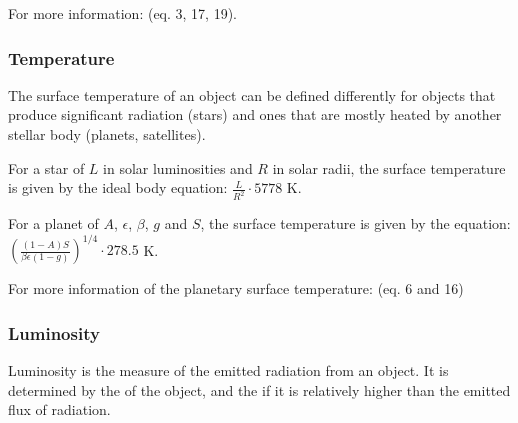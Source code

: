 \documentclass[letterpaper,10pt,english]{sphinxmanual}
\begin{document}
\sphinxAtStartPar
For more information:  (eq. 3, 17, 19).


\subsubsection{Temperature}
\label{\detokenize{quantities/surface/emission/temperature:temperature}}\label{\detokenize{quantities/surface/emission/temperature::doc}}\label{\detokenize{quantities/surface/emission/temperature:id1}}
\sphinxAtStartPar
The surface temperature of an object can be defined differently for objects
that produce significant radiation (stars) and ones that are mostly heated
by another stellar body (planets, satellites).

\sphinxAtStartPar
For a star of {\hyperref[\detokenize{quantities/surface/emission/luminosity:id1}]{}} \(L\) in solar luminosities
and {\hyperref[\detokenize{quantities/geometric/radius:id1}]{}} \(R\) in solar radii, the surface temperature
is given by the ideal body equation: \(\frac{L}{R^2} \cdot 5778\) K.

\sphinxAtStartPar
For a planet of {\hyperref[\detokenize{quantities/surface/emission/albedo:id1}]{}} \(A\), {\hyperref[\detokenize{quantities/surface/emission/emissivity:id1}]{}} \(\epsilon\),
{\hyperref[\detokenize{quantities/surface/emission/heat_distribution:id1}]{}} \(\beta\),
{\hyperref[\detokenize{quantities/surface/emission/normalized_greenhouse:id1}]{}} \(g\) and
{\hyperref[\detokenize{quantities/surface/emission/incident_flux:id1}]{}} \(S\),
the surface temperature is given by the equation:
\(\left(\frac{(1 - A) S}{\beta \epsilon (1 - g)}\right)^{1/4} \cdot 278.5\) K.

\sphinxAtStartPar
For more information of the planetary surface temperature:
 (eq. 6 and 16)


\subsubsection{Luminosity}
\label{\detokenize{quantities/surface/emission/luminosity:luminosity}}\label{\detokenize{quantities/surface/emission/luminosity::doc}}\label{\detokenize{quantities/surface/emission/luminosity:id1}}
\sphinxAtStartPar
Luminosity is the measure of the emitted radiation from an object.
It is determined by the {\hyperref[\detokenize{quantities/material/mass:id1}]{}} of the object, and the
{\hyperref[\detokenize{quantities/surface/emission/incident_flux:id1}]{}} if it is relatively higher than the emitted flux
of radiation.
\end{document}
